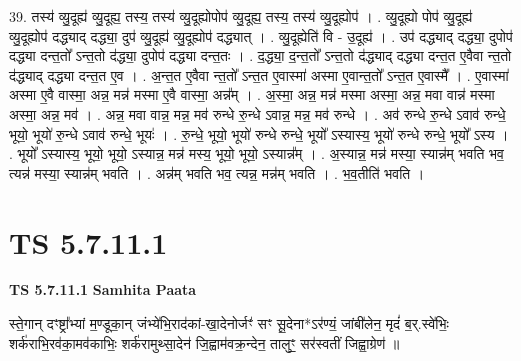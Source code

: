 \documentclass[17pt]{extarticle}
\begin{document}
39. तस्य॑ व्यु॒दूह्य॑ व्यु॒दूह्य॒ तस्य॒ तस्य॑ व्यु॒दूह्योपोप॑ व्यु॒दूह्य॒ तस्य॒ तस्य॑ व्यु॒दूह्योप॑ । . व्यु॒दूह्यो पोप॑ व्यु॒दूह्य॑ व्यु॒दूह्योप॑ दद्ध्याद् दद्ध्या॒ दुप॑ व्यु॒दूह्य॑ व्यु॒दूह्योप॑ दद्ध्यात् । . व्यु॒दूह्येति॑ वि - उ॒दूह्य॑ । . उप॑ दद्ध्याद् दद्ध्या॒ दुपोप॑ दद्ध्या दन्त॒तो᳚ ऽन्त॒तो द॑द्ध्या॒ दुपोप॑ दद्ध्या दन्त॒तः । . द॒द्ध्या॒ द॒न्त॒तो᳚ ऽन्त॒तो द॑द्ध्याद् दद्ध्या दन्त॒त ए॒वैवा न्त॒तो द॑द्ध्याद् दद्ध्या दन्त॒त ए॒व । . अ॒न्त॒त ए॒वैवा न्त॒तो᳚ ऽन्त॒त ए॒वास्मा॑ अस्मा ए॒वान्त॒तो᳚ ऽन्त॒त ए॒वास्मै᳚ । . ए॒वास्मा॑ अस्मा ए॒वै वास्मा॒ अन्न॒ मन्न॑ मस्मा ए॒वै वास्मा॒ अन्न᳚म् । . अ॒स्मा॒ अन्न॒ मन्न॑ मस्मा अस्मा॒ अन्न॒ मवा वान्न॑ मस्मा अस्मा॒ अन्न॒ मव॑ । . अन्न॒ मवा वान्न॒ मन्न॒ मव॑ रुन्धे रु॒न्धे ऽवान्न॒ मन्न॒ मव॑ रुन्धे । . अव॑ रुन्धे रु॒न्धे ऽवाव॑ रुन्धे॒ भूयो॒ भूयो॑ रु॒न्धे ऽवाव॑ रुन्धे॒ भूयः॑ । . रु॒न्धे॒ भूयो॒ भूयो॑ रुन्धे रुन्धे॒ भूयो᳚ ऽस्यास्य॒ भूयो॑ रुन्धे रुन्धे॒ भूयो᳚ ऽस्य । . भूयो᳚ ऽस्यास्य॒ भूयो॒ भूयो॒ ऽस्यान्न॒ मन्न॑ मस्य॒ भूयो॒ भूयो॒ ऽस्यान्न᳚म् । . अ॒स्यान्न॒ मन्न॑ मस्या॒ स्यान्न॑म् भवति भव॒ त्यन्न॑ मस्या॒ स्यान्न॑म् भवति । . अन्न॑म् भवति भव॒ त्यन्न॒ मन्न॑म् भवति । . भ॒व॒तीति॑ भवति । \newline
\pagebreak
{}

\section{ TS 5.7.11.1 }

\textbf{TS 5.7.11.1 } \newline
\textbf{Samhita Paata} \newline

स्ते॒गान् दꣳष्ट्रा᳚भ्यां म॒ण्डूका॒न् जंभ्ये॑भि॒राद॑कां-खा॒देनोर्जꣳ॑ सꣳ सू॒देना*ऽर॑ण्यं॒ जांबी॑लेन॒ मृदं॑ ब॒र्.स्वे॑भिः॒ शर्क॑राभि॒रव॑का॒मव॑काभिः॒ शर्क॑रामुथ्सा॒देन॑ जि॒ह्वाम॑वक्र॒न्देन॒ तालुꣳ॒॒ सर॑स्वतीं जिह्वा॒ग्रेण॑ ॥ \newline
\end{document}
